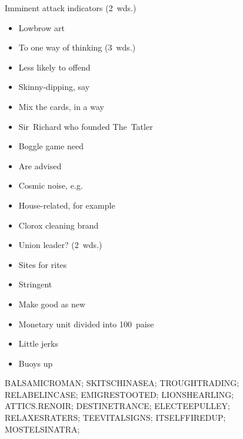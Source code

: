{\begin{itemize}
        Imminent attack indicators (2~wds.)
    \end{itemize}
  \item
    \begin{itemize}
      \item
        Lowbrow art
      \item
        To one way of thinking (3~wds.)
      \item
        Less likely to offend
      \item
        Skinny-dipping, say
      \item
        Mix the cards, in a way
      \item
        Sir~Richard who founded The~Tatler
      \item
        Boggle game need
    \end{itemize}
  \item
    \begin{itemize}
      \item
        Are advised
      \item
        Cosmic noise, e.g.
      \item
        House-related, for example
      \item
        Clorox cleaning brand
    \end{itemize}
  \item
    \begin{itemize}
      \item
        Union leader? (2~wds.)
      \item
        Sites for rites
      \item
        Stringent
    \end{itemize}
  \item
    \begin{itemize}
      \item
        Make good as new
      \item
        Monetary unit divided into 100~paise
      \item
        Little jerks
    \end{itemize}
  \item
    \begin{itemize}
      \item
        Buoys up
    \end{itemize}
}{%
  \puzzlerow BALSAMICROMAN;
  \puzzlerow SKITSCHINASEA;
  \puzzlerow TROUGHTRADING;
  \puzzlerow RELABELINCASE;
  \puzzlerow EMIGRESTOOTED;
  \puzzlerow LIONSHEARLING;
  \puzzlerow ATTICS.RENOIR;
  \puzzlerow DESTINETRANCE;
  \puzzlerow ELECTEEPULLEY;
  \puzzlerow RELAXESRATERS;
  \puzzlerow TEEVITALSIGNS;
  \puzzlerow ITSELFFIREDUP;
  \puzzlerow MOSTELSINATRA;
}
